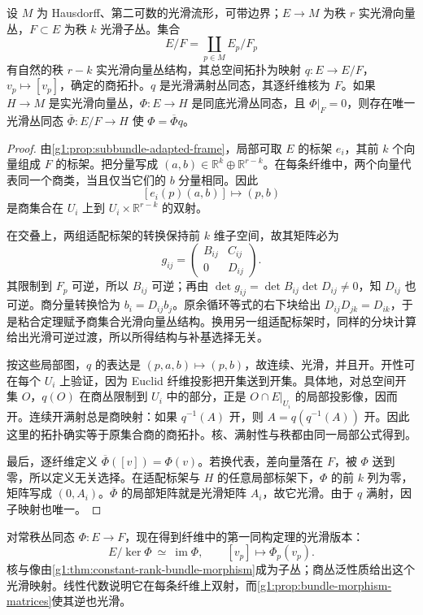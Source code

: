 \begin{proposition}
	\label{g1:prop:quotient-vector-bundle}
	设 \(M\) 为 Hausdorff、第二可数的光滑流形，可带边界；\(E\to M\) 为秩 \(r\) 实光滑向量丛，\(F\subset E\) 为秩 \(k\) 光滑子丛。集合
	\[
		E/F=\coprod_{p\in M}E_p/F_p
	\]
	有自然的秩 \(r-k\) 实光滑向量丛结构，其总空间拓扑为映射 \(q:E\to E/F\)，\(v_p\mapsto[v_p]\)，确定的商拓扑。\(q\) 是光滑满射丛同态，其逐纤维核为 \(F\)。如果 \(H\to M\) 是实光滑向量丛，\(\Phi:E\to H\) 是同底光滑丛同态，且 \(\Phi|_F=0\)，则存在唯一光滑丛同态 \(\overline\Phi:E/F\to H\) 使 \(\Phi=\overline\Phi q\)。
\end{proposition}
\begin{proof}
	由\cref{g1:prop:subbundle-adapted-frame}，局部可取 \(E\) 的标架 \(e_i\)，其前 \(k\) 个向量组成 \(F\) 的标架。把分量写成 \((a,b)\in\mathbb R^k\oplus\mathbb R^{r-k}\)。在每条纤维中，两个向量代表同一个商类，当且仅当它们的 \(b\) 分量相同。因此
	\[
		[e_i(p)(a,b)]\longmapsto(p,b)
	\]
	是商集合在 \(U_i\) 上到 \(U_i\times\mathbb R^{r-k}\) 的双射。

	在交叠上，两组适配标架的转换保持前 \(k\) 维子空间，故其矩阵必为
	\[
		g_{ij}=\begin{pmatrix}B_{ij}&C_{ij}\\0&D_{ij}\end{pmatrix}.
	\]
	其限制到 \(F_p\) 可逆，所以 \(B_{ij}\) 可逆；再由 \(\det g_{ij}=\det B_{ij}\det D_{ij}\ne0\)，知 \(D_{ij}\) 也可逆。商分量转换恰为 \(b_i=D_{ij}b_j\)。原余循环等式的右下块给出 \(D_{ij}D_{jk}=D_{ik}\)，于是粘合定理赋予商集合光滑向量丛结构。换用另一组适配标架时，同样的分块计算给出光滑可逆过渡，所以所得结构与补基选择无关。

	按这些局部图，\(q\) 的表达是 \((p,a,b)\mapsto(p,b)\)，故连续、光滑，并且开。开性可在每个 \(U_i\) 上验证，因为 Euclid 纤维投影把开集送到开集。具体地，对总空间开集 \(O\)，\(q(O)\) 在商丛限制到 \(U_i\) 中的部分，正是 \(O\cap E|_{U_i}\) 的局部投影像，因而开。连续开满射总是商映射：如果 \(q^{-1}(A)\) 开，则 \(A=q(q^{-1}(A))\) 开。因此这里的拓扑确实等于原集合商的商拓扑。核、满射性与秩都由同一局部公式得到。

	最后，逐纤维定义 \(\overline\Phi([v])=\Phi(v)\)。若换代表，差向量落在 \(F\)，被 \(\Phi\) 送到零，所以定义无关选择。在适配标架与 \(H\) 的任意局部标架下，\(\Phi\) 的前 \(k\) 列为零，矩阵写成 \((0,A_i)\)。\(\overline\Phi\) 的局部矩阵就是光滑矩阵 \(A_i\)，故它光滑。由于 \(q\) 满射，因子映射也唯一。
\end{proof}

对常秩丛同态 \(\Phi:E\to F\)，现在得到纤维中的第一同构定理的光滑版本：
\begin{equation}
	\label{g1:eq:bundle-first-isomorphism}
	E/\ker\Phi\ \simeq\ \operatorname{im}\Phi,
	\qquad [v_p]\longmapsto\Phi_p(v_p).
\end{equation}
核与像由\cref{g1:thm:constant-rank-bundle-morphism}成为子丛；商丛泛性质给出这个光滑映射。线性代数说明它在每条纤维上双射，而\cref{g1:prop:bundle-morphism-matrices}使其逆也光滑。

